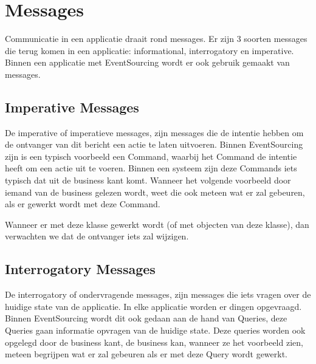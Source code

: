 
\section{Messages}
\label{sec:messages}

Communicatie in een applicatie draait rond messages. Er zijn 3 soorten messages die terug komen in een applicatie: informational, interrogatory en imperative. \textcite{Verraes2015Messages}
Binnen een applicatie met EventSourcing wordt er ook gebruik gemaakt van messages.


\subsection{Imperative Messages}
\label{subsec:imperative-messages}

De imperative of imperatieve messages, zijn messages die de intentie hebben om de ontvanger van dit bericht een actie te laten uitvoeren.
Binnen EventSourcing zijn is een typisch voorbeeld een Command, waarbij het Command de intentie heeft om een actie uit te voeren. Binnen een systeem zijn deze Commands iets typisch dat uit de business kant komt. Wanneer het volgende voorbeeld door iemand van de business gelezen wordt, weet die ook meteen wat er zal gebeuren, als er gewerkt wordt met deze Command.


Wanneer er met deze klasse gewerkt wordt (of met objecten van deze klasse), dan verwachten we dat de ontvanger iets zal wijzigen.

\subsection{Interrogatory Messages}
\label{subsec:interrogatory-messages}

De interrogatory of ondervragende messages, zijn messages die iets vragen over de huidige state van de applicatie. In elke applicatie worden er dingen opgevraagd. Binnen EventSourcing wordt dit ook gedaan aan de hand van Queries, deze Queries gaan informatie opvragen van de huidige state. Deze queries worden ook opgelegd door de business kant, de business kan, wanneer ze het voorbeeld zien, meteen begrijpen wat er zal gebeuren als er met deze Query wordt gewerkt.

